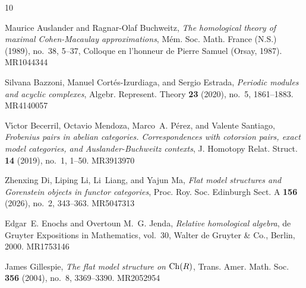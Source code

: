 \documentclass{amsart}
\theoremstyle{bfupright head,slanted body}
\theoremstyle{bfupright head,upright body}
\theoremstyle{fixed bf head,slanted body}
\theoremstyle{fixed bf head,upright body}
\theoremstyle{numbered paragraph}
\numberwithin{equation}{res}
\begin{document}

%
%

\def\cprime{$'$}
  \providecommand{\arxiv}[2][AC]{\mbox{\href{http://arxiv.org/abs/#2}{\sf
  arXiv:#2 [math.#1]}}}
  \providecommand{\oldarxiv}[2][AC]{\mbox{\href{http://arxiv.org/abs/math/#2}{\sf
  arXiv:math/#2
  [math.#1]}}}\providecommand{\MR}[1]{\mbox{\href{http://www.ams.org/mathscinet-getitem?mr=#1}{#1}}}
  \renewcommand{\MR}[1]{\mbox{\href{http://www.ams.org/mathscinet-getitem?mr=#1}{#1}}}
\providecommand{\bysame}{\leavevmode\hbox to3em{\hrulefill}\thinspace}
\providecommand{\MR}{\relax\ifhmode\unskip\space\fi MR }
\providecommand{\MRhref}[2]{%
  \href{http://www.ams.org/mathscinet-getitem?mr=#1}{#2}
}
\providecommand{\href}[2]{#2}
\begin{thebibliography}{10}

Maurice Auslander and Ragnar-Olaf Buchweitz, \emph{The homological theory of
  maximal {C}ohen-{M}acaulay approximations}, M\'em. Soc. Math. France (N.S.)
  (1989), no.~38, 5--37, Colloque en l'honneur de Pierre Samuel (Orsay, 1987).
  \MR{MR1044344}

Silvana Bazzoni, Manuel Cort\'{e}s-Izurdiaga, and Sergio Estrada,
  \emph{Periodic modules and acyclic complexes}, Algebr. Represent. Theory
  \textbf{23} (2020), no.~5, 1861--1883. \MR{MR4140057}

V\'{\i}ctor Becerril, Octavio Mendoza, Marco~A. P\'{e}rez, and Valente
  Santiago, \emph{Frobenius pairs in abelian categories. {C}orrespondences with
  cotorsion pairs, exact model categories, and {A}uslander-{B}uchweitz
  contexts}, J. Homotopy Relat. Struct. \textbf{14} (2019), no.~1, 1--50.
  \MR{MR3913970}

Zhenxing Di, Liping Li, Li~Liang, and Yajun Ma, \emph{Flat model structures and
  {G}orenstein objects in functor categories}, Proc. Roy. Soc. Edinburgh Sect.
  A \textbf{156} (2026), no.~2, 343--363. \MR{MR5047313}

Edgar~E. Enochs and Overtoun M.~G. Jenda, \emph{Relative homological algebra},
  de Gruyter Expositions in Mathematics, vol.~30, Walter de Gruyter \& Co.,
  Berlin, 2000. \MR{MR1753146}

James Gillespie, \emph{The flat model structure on {${\rm Ch}(R)$}}, Trans.
  Amer. Math. Soc. \textbf{356} (2004), no.~8, 3369--3390. \MR{MR2052954}


\end{thebibliography}
\end{document}
